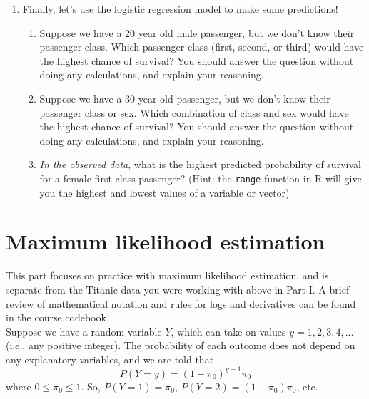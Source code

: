 \documentclass[11pt]{article}
\begin{document}
\begin{enumerate}
\item Finally, let's use the logistic regression model to make some predictions!

\begin{enumerate}
\item Suppose we have a 20 year old male passenger, but we don't know their passenger class. Which passenger class (first, second, or third) would have the highest chance of survival? You should answer the question without doing any calculations, and explain your reasoning.

\item Suppose we have a 30 year old passenger, but we don't know their passenger class or sex. Which combination of class and sex would have the highest chance of survival? You should answer the question without doing any calculations, and explain your reasoning.

\item \textit{In the observed data}, what is the highest predicted probability of survival for a female first-class passenger? (Hint: the \verb;range; function in R will give you the highest and lowest values of a variable or vector)

\end{enumerate}

\end{enumerate}

\newpage

\section{Maximum likelihood estimation}

This part focuses on practice with maximum likelihood estimation, and is separate from the Titanic data you were working with above in Part I. A brief review of mathematical notation and rules for logs and derivatives can be found in the course codebook.\\

\noindent Suppose we have a random variable $Y$, which can take on values $y = 1, 2, 3, 4,...$ (i.e., any positive integer). The probability of each outcome does not depend on any explanatory variables, and we are told that
$$P(Y = y) = (1 - \pi_0)^{y-1} \pi_0$$
where $0 \leq \pi_0 \leq 1$. So, $P(Y = 1) = \pi_0$, $P(Y = 2) = (1 - \pi_0)\pi_0$, etc.
\end{document}
